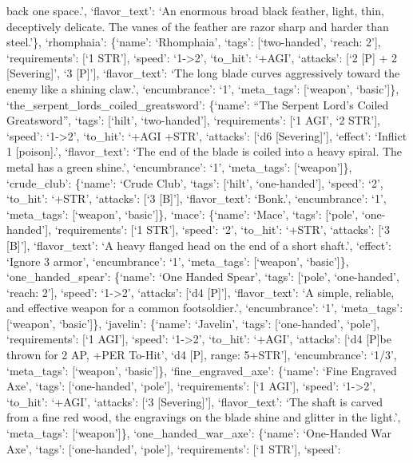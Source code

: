 \documentclass[
  letterpaper,
  DIV=11,
  numbers=noendperiod]{scrartcl}
\begin{document}
back one space.', `flavor\_text': `An enormous broad black feather,
light, thin, deceptively delicate. The vanes of the feather are razor
sharp and harder than steel.'\}, `rhomphaia': \{`name': `Rhomphaia',
`tags': {[}`two-handed', `reach: 2'{]}, `requirements': {[}`1 STR'{]},
`speed': `1-\textgreater2', `to\_hit': `+AGI', `attacks': {[}`2 {[}P{]}
+ 2 {[}Severing{]}', `3 {[}P{]}'{]}, `flavor\_text': `The long blade
curves aggressively toward the enemy like a shining claw.',
`encumbrance': `1', `meta\_tags': {[}`weapon', `basic'{]}\},
`the\_serpent\_lords\_coiled\_greatsword': \{`name': ``The Serpent
Lord's Coiled Greatsword'', `tags': {[}`hilt', `two-handed'{]},
`requirements': {[}`1 AGI', `2 STR'{]}, `speed': `1-\textgreater2',
`to\_hit': `+AGI +STR', `attacks': {[}`d6 {[}Severing{]}'{]}, `effect':
`Inflict 1 {[}poison{]}.', `flavor\_text': `The end of the blade is
coiled into a heavy spiral. The metal has a green shine.',
`encumbrance': `1', `meta\_tags': {[}`weapon'{]}\}, `crude\_club':
\{`name': `Crude Club', `tags': {[}`hilt', `one-handed'{]}, `speed':
`2', `to\_hit': `+STR', `attacks': {[}`3 {[}B{]}'{]}, `flavor\_text':
`Bonk.', `encumbrance': `1', `meta\_tags': {[}`weapon', `basic'{]}\},
`mace': \{`name': `Mace', `tags': {[}`pole', `one-handed'{]},
`requirements': {[}`1 STR'{]}, `speed': `2', `to\_hit': `+STR',
`attacks': {[}`3 {[}B{]}'{]}, `flavor\_text': `A heavy flanged head on
the end of a short shaft.', `effect': `Ignore 3 armor', `encumbrance':
`1', `meta\_tags': {[}`weapon', `basic'{]}\}, `one\_handed\_spear':
\{`name': `One Handed Spear', `tags': {[}`pole', `one-handed', `reach:
2'{]}, `speed': `1-\textgreater2', `attacks': {[}`d4 {[}P{]}'{]},
`flavor\_text': `A simple, reliable, and effective weapon for a common
footsoldier.', `encumbrance': `1', `meta\_tags': {[}`weapon',
`basic'{]}\}, `javelin': \{`name': `Javelin', `tags': {[}`one-handed',
`pole'{]}, `requirements': {[}`1 AGI'{]}, `speed': `1-\textgreater2',
`to\_hit': `+AGI', `attacks': {[}`d4 {[}P{]}\nCan be thrown for 2 AP,
+PER To-Hit', `d4 {[}P{]}, range: 5+STR'{]}, `encumbrance': `1/3',
`meta\_tags': {[}`weapon', `basic'{]}\}, `fine\_engraved\_axe':
\{`name': `Fine Engraved Axe', `tags': {[}`one-handed', `pole'{]},
`requirements': {[}`1 AGI'{]}, `speed': `1-\textgreater2', `to\_hit':
`+AGI', `attacks': {[}`3 {[}Severing{]}'{]}, `flavor\_text': `The shaft
is carved from a fine red wood, the engravings on the blade shine and
glitter in the light.', `meta\_tags': {[}`weapon'{]}\},
`one\_handed\_war\_axe': \{`name': `One-Handed War Axe', `tags':
{[}`one-handed', `pole'{]}, `requirements': {[}`1 STR'{]}, `speed':
\end{document}
